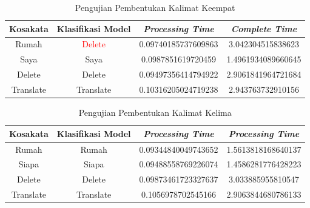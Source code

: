 \begin{longtable}{|c|c|c|c|}
  \caption{Pengujian Pembentukan Kalimat Keempat}
  \label{tb:prediksikombinasi4}                                   \\
  \hline
  \rowcolor[HTML]{C0C0C0}
  \textbf{Kosakata} & \textbf{Klasifikasi Model} & \textbf{\emph{Processing Time}} & \textbf{\emph{Complete Time}}\\
  \hline
  Rumah              & \textcolor{red}{Delete}                        & 0.09740185737609863                           & 3.042304515838623                                  \\
  Saya            & Saya                        & 0.0987851619720459                           & 1.4961934089660645                                  \\
  Delete              & Delete                        & 0.09497356414794922                           & 2.9061841964721684                                  \\
  Translate              & Translate                        & 0.10316205024719238                           & 2.943763732910156                                  \\
  \hline
\end{longtable}


\begin{longtable}{|c|c|c|c|}
  \caption{Pengujian Pembentukan Kalimat Kelima}
  \label{tb:prediksikombinasi5}                                   \\
  \hline
  \rowcolor[HTML]{C0C0C0}
  \textbf{Kosakata} & \textbf{Klasifikasi Model} & \textbf{\emph{Processing Time}} & \textbf{\emph{Processing Time}}\\
  \hline
  Rumah              & Rumah                        & 0.09344840049743652                           & 1.5613818168640137                                  \\
  Siapa            & Siapa                        & 0.09488558769226074                           & 1.4586281776428223                                  \\
  Delete              & Delete                        & 0.09873461723327637                           & 3.033885955810547                                  \\
  Translate              & Translate                        & 0.1056978702545166                           & 2.9063844680786133                                  \\
  \hline
\end{longtable}

